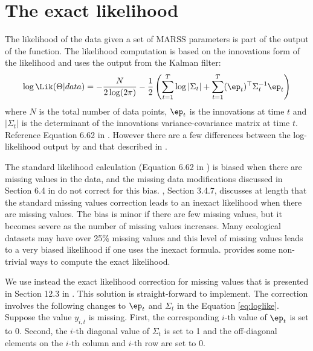 \section{The exact likelihood}
\label{sec:exactlikelihood}
The likelihood of the data given a set of MARSS parameters is part of the output of the \verb@MARSSkf@{}
 function.  The likelihood computation is based on the innovations form of the likelihood \citep{Schweppe1965} and uses the output from the Kalman filter:
\begin{equation}
\log \Lik(\Theta | data) = -\frac{N}{2\log(2\pi)} - \frac{1}{2}\left( \sum_{t=1}^T\log |\Sigma_t| + \sum_{t=1}^T (\ep_t)^\top \Sigma_t^{-1} \ep_t \right)
\label{eq:loglike}
\end{equation}
where $N$ is the total number of data points, $\ep_t$ is the innovations at time $t$ and $|\Sigma_t|$ is the determinant of the innovations variance-covariance matrix at time $t$.  Reference Equation 6.62 in \citet{ShumwayStoffer2006}. However there are a few differences between the log-likelihood output by \verb@MARSSkf@{} and that described in \citet{ShumwayStoffer2006}.

The standard likelihood calculation (Equation 6.62 in \citet{ShumwayStoffer2006}) is biased when there are missing values in the data, and the missing data modifications discussed in Section 6.4 in \citet{ShumwayStoffer2006} do not correct for this bias. \citet{Harvey1989}, Section 3.4.7, discusses at length that the standard missing values correction leads to an inexact likelihood when there are missing values. The bias is minor if there are few missing values, but it becomes severe as the number of missing values increases.  Many ecological datasets may have over 25\% missing values and this level of missing values leads to a very biased likelihood if one uses the inexact formula.  \citet{Harvey1989} provides some non-trivial ways to compute the exact likelihood.  

We use instead the exact likelihood correction for missing values that is presented in Section 12.3 in \citet{BrockwellDavis1991}.  This solution is straight-forward to implement.  The correction involves the following changes to $\ep_t$ and $\Sigma_t$ in the Equation \ref{eq:loglike}.  Suppose the value $y_{i,t}$ is missing.  First, the corresponding $i$-th value of $\ep_t$ is set to 0.  Second, the $i$-th diagonal value of $\Sigma_t$ is set to 1 and the off-diagonal elements on the $i$-th column and $i$-th row are set to 0.

